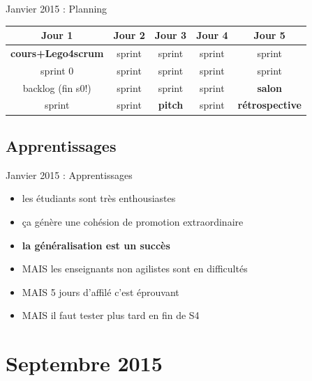 \documentclass{beamer}
\begin{document}
\begin{frame}{Janvier 2015 : Planning}
  \begin{center}
    \begin{tabular}{| c | c | c | c | c |}
      \hline
      \textbf{Jour 1} & \textbf{Jour 2} & \textbf{Jour 3} & \textbf{Jour 4} & \textbf{Jour 5} \\
      \hline \hline
      \textbf{cours+Lego4scrum}      & sprint          & sprint          & sprint          & sprint          \\
      \hline
      sprint 0       & sprint          & sprint          & sprint          & sprint          \\
      \hline \hline
      backlog (fin s0!)         & sprint          & sprint          & sprint          & \textbf{salon}           \\
      \hline
      sprint        & sprint          & \textbf{pitch}           & sprint          & \textbf{rétrospective}   \\
      \hline
    \end{tabular}
  \end{center}
\end{frame}

\subsection{Apprentissages}
\begin{frame}{Janvier 2015 : Apprentissages}
  \begin{itemize}
    \item les étudiants sont très enthousiastes
    \item ça génère une cohésion de promotion extraordinaire
    \item \textbf{la généralisation est un succès}
    \item MAIS les enseignants non agilistes sont en difficultés
    \item MAIS 5 jours d'affilé c'est éprouvant
    \item MAIS il faut tester plus tard en fin de S4
  \end{itemize}
\end{frame}

\section{Septembre 2015}
\end{document}
